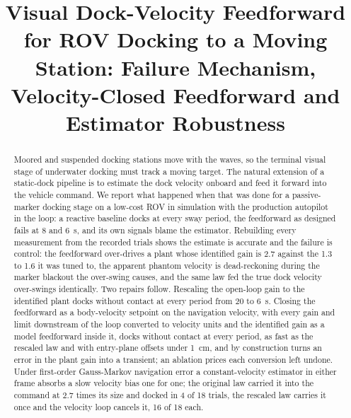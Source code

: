 \documentclass[conference,a4paper]{IEEEtran}
\begin{document}
\title{Visual Dock-Velocity Feedforward for ROV Docking to a Moving Station: Failure Mechanism, Velocity-Closed Feedforward and Estimator Robustness}

\author{
\and
{}
}

\maketitle

\begin{abstract}
Moored and suspended docking stations move with the waves, so the terminal visual stage of underwater docking must track a moving target. The natural extension of a static-dock pipeline is to estimate the dock velocity onboard and feed it forward into the vehicle command. We report what happened when that was done for a passive-marker docking stage on a low-cost ROV in simulation with the production autopilot in the loop: a reactive baseline docks at every sway period, the feedforward as designed fails at 8 and 6~s, and its own signals blame the estimator. Rebuilding every measurement from the recorded trials shows the estimate is accurate and the failure is control: the feedforward over-drives a plant whose identified gain is 2.7 against the 1.3 to 1.6 it was tuned to, the apparent phantom velocity is dead-reckoning during the marker blackout the over-swing causes, and the same law fed the true dock velocity over-swings identically. Two repairs follow. Rescaling the open-loop gain to the identified plant docks without contact at every period from 20 to 6~s. Closing the feedforward as a body-velocity setpoint on the navigation velocity, with every gain and limit downstream of the loop converted to velocity units and the identified gain as a model feedforward inside it, docks without contact at every period, as fast as the rescaled law and with entry-plane offsets under 1~cm, and by construction turns an error in the plant gain into a transient; an ablation prices each conversion left undone. Under first-order Gauss-Markov navigation error a constant-velocity estimator in either frame absorbs a slow velocity bias one for one; the original law carried it into the command at 2.7 times its size and docked in 4 of 18 trials, the rescaled law carries it once and the velocity loop cancels it, 16 of 18 each.
\end{abstract}
\end{document}
